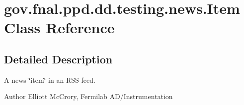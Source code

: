 \hypertarget{classgov_1_1fnal_1_1ppd_1_1dd_1_1testing_1_1news_1_1Item}{\section{gov.\-fnal.\-ppd.\-dd.\-testing.\-news.\-Item Class Reference}
\label{classgov_1_1fnal_1_1ppd_1_1dd_1_1testing_1_1news_1_1Item}
}


\subsection{Detailed Description}
A news \char`\"{}item\char`\"{} in an R\-S\-S feed.

\begin{DoxyAuthor}{Author}
Elliott Mc\-Crory, Fermilab A\-D/\-Instrumentation 
\end{DoxyAuthor}
